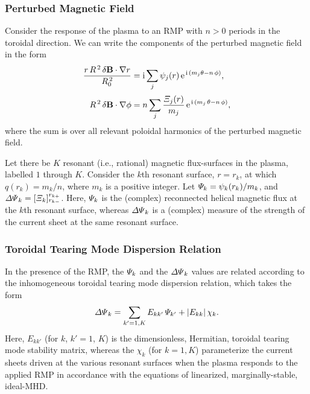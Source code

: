 \documentclass[12pt,prb,aps]{revtex4-1}
\begin{document}
\subsubsection{Perturbed Magnetic Field}
Consider the response of the plasma to an RMP with $n>0$ periods in the toroidal direction.
We can write the components of the perturbed magnetic field in the form\,\cite{rftor}
\begin{align}
\frac{r\,R^{\,2}\,\delta{\bf B}\cdot\nabla r}{R_0^{\,2}}&= {\rm i}\sum_j \psi_j(r)\,{\rm e}^{\,{\rm i}\,(m_j\theta-n\,\phi)},\\[0.5ex]
R^{\,2}\,\delta{\bf B}\cdot\nabla\phi&= n\sum_j \frac{{\mit\Xi}_j(r)}{m_j}\,{\rm e}^{\,{\rm i}\,(m_j\,\theta-n\,\phi)},
\end{align}
where the sum is over all relevant poloidal harmonics of the perturbed magnetic field. 

Let there be $K$ resonant (i.e., rational) magnetic flux-surfaces in the plasma, labelled $1$ through $K$.
Consider the $k$th resonant surface, $r=r_k$, at which $q(r_k)= m_k/n$, where $m_k$ is a positive integer. Let
${\mit\Psi}_k = \psi_k(r_k)/m_k$, and 
${\mit\Delta\Psi}_k=[{\mit\Xi}_k]_{r_{k-}}^{r_{k+}}$.
Here, ${\mit\Psi}_k$ is the (complex) reconnected helical magnetic flux at the $k$th resonant surface, whereas ${\mit\Delta\Psi}_k$  is a (complex) 
measure of the strength of the current sheet  at the same resonant surface. 

\subsubsection{Toroidal Tearing Mode Dispersion Relation}\label{tear}
In the presence of the RMP, the ${\mit\Psi}_k$ and the ${\mit\Delta\Psi}_k$ values are related according to the inhomogeneous 
toroidal tearing mode dispersion relation, which takes the form\,\cite{tt3,rftor}
\begin{equation}\label{dispersion}
{\mit\Delta\Psi}_k = \sum_{k'=1,K} E_{kk'}\,{\mit\Psi}_{k'} + |E_{kk}|\,\chi_k.
\end{equation}
Here, $E_{kk'}$  (for $k$, $k'= 1$, $K$) is the dimensionless, Hermitian, toroidal tearing mode stability matrix,\cite{tt3} whereas the $\chi_k$ (for $k=1,K$) parameterize the current sheets driven at the various
resonant surfaces when the plasma responds  to the applied RMP in accordance with the equations of linearized, marginally-stable, ideal-MHD. 
\end{document}
